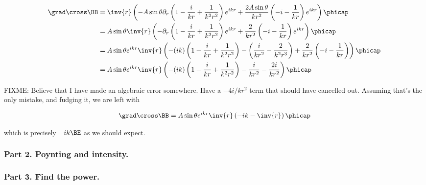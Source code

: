 \begin{align*}
\grad \cross \BB 
&=
\inv{r } \left(
- A\sin\theta 
\partial_r \left( 1 - \frac{i}{k r} + \frac{1}{k^2 r^2} \right) e^{i k r} 
+\frac{2 A \sin\theta}{k r^2} 
\left( -i - \frac{1}{kr} \right) e^{i k r} 
\right) \phicap \\
&=
A \sin\theta 
\inv{r } \left(
- 
\partial_r \left( 1 - \frac{i}{k r} + \frac{1}{k^2 r^2} \right) e^{i k r} 
+\frac{2 }{k r^2} 
\left( -i - \frac{1}{kr} \right) e^{i k r} 
\right) \phicap \\
&=
A \sin\theta e^{i k r}
\inv{r } \left(
- 
(ik)\left( 1 - \frac{i}{k r} + \frac{1}{k^2 r^2} \right) 
-\left( \frac{i}{k r^2} - \frac{2}{k^2 r^3} \right) 
+\frac{2 }{k r^2} 
\left( -i - \frac{1}{kr} \right) 
\right) \phicap \\
&=
A \sin\theta e^{i k r}
\inv{r } \left(
- 
(ik)\left( 1 - \frac{i}{k r} + \frac{1}{k^2 r^2} \right) 
-\frac{i}{k r^2} 
-\frac{2i }{k r^2} 
\right) \phicap \\
\end{align*}

FIXME: Believe that I have made an algebraic error somewhere.  Have a $-4i/kr^2$ term that should have cancelled out.  Assuming that's the only mistake, and fudging it, we are left with

\begin{equation}\label{eqn:relElectroDynProblemSet4:n}
\grad \cross \BB 
=
A \sin\theta e^{i k r}
\inv{r } \left(
- i k - \inv{r}
\right) \phicap 
\end{equation}

which is precisely $-i k \BE$ as we should expect.

\subsubsection{Part 2.  Poynting and intensity.}
\subsubsection{Part 3.  Find the power.}
